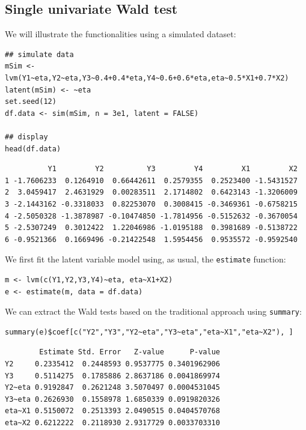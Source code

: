 \documentclass[12pt]{article}
\begin{document}
\subsection{Single univariate Wald test}
\label{sec:orgf8075cd}

We will illustrate the functionalities using a simulated dataset:
\lstset{language=r,label= ,caption= ,captionpos=b,numbers=none}
\begin{lstlisting}
## simulate data
mSim <- lvm(Y1~eta,Y2~eta,Y3~0.4+0.4*eta,Y4~0.6+0.6*eta,eta~0.5*X1+0.7*X2)
latent(mSim) <- ~eta
set.seed(12)
df.data <- sim(mSim, n = 3e1, latent = FALSE)

## display
head(df.data)
\end{lstlisting}

\begin{verbatim}
          Y1         Y2          Y3         Y4         X1         X2
1 -1.7606233  0.1264910  0.66442611  0.2579355  0.2523400 -1.5431527
2  3.0459417  2.4631929  0.00283511  2.1714802  0.6423143 -1.3206009
3 -2.1443162 -0.3318033  0.82253070  0.3008415 -0.3469361 -0.6758215
4 -2.5050328 -1.3878987 -0.10474850 -1.7814956 -0.5152632 -0.3670054
5 -2.5307249  0.3012422  1.22046986 -1.0195188  0.3981689 -0.5138722
6 -0.9521366  0.1669496 -0.21422548  1.5954456  0.9535572 -0.9592540
\end{verbatim}


We first fit the latent variable model using, as usual, the \texttt{estimate}
function:
\lstset{language=r,label= ,caption= ,captionpos=b,numbers=none}
\begin{lstlisting}
m <- lvm(c(Y1,Y2,Y3,Y4)~eta, eta~X1+X2)
e <- estimate(m, data = df.data)
\end{lstlisting}

We can extract the Wald tests based on the traditional approach using
\texttt{summary}:
\lstset{language=r,label= ,caption= ,captionpos=b,numbers=none}
\begin{lstlisting}
summary(e)$coef[c("Y2","Y3","Y2~eta","Y3~eta","eta~X1","eta~X2"), ]
\end{lstlisting}

\begin{verbatim}
        Estimate Std. Error   Z-value      P-value
Y2     0.2335412  0.2448593 0.9537775 0.3401962906
Y3     0.5114275  0.1785886 2.8637186 0.0041869974
Y2~eta 0.9192847  0.2621248 3.5070497 0.0004531045
Y3~eta 0.2626930  0.1558978 1.6850339 0.0919820326
eta~X1 0.5150072  0.2513393 2.0490515 0.0404570768
eta~X2 0.6212222  0.2118930 2.9317729 0.0033703310
\end{verbatim}
\end{document}
